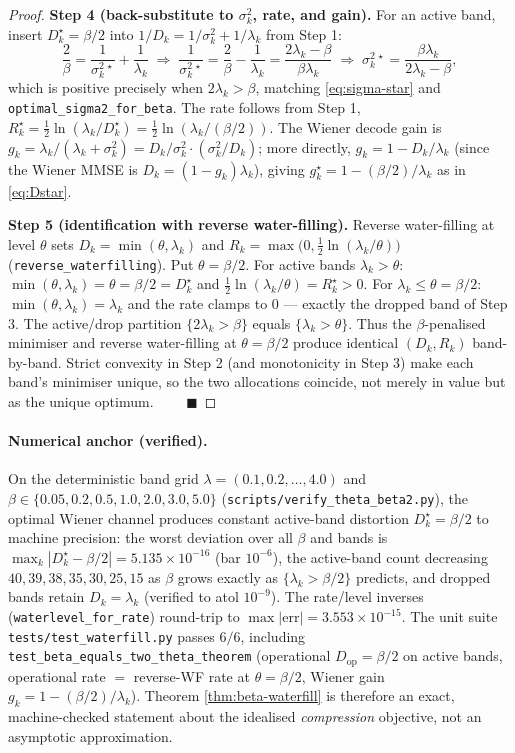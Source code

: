 \begin{proof}
\textbf{Step 4 (back-substitute to $\sigma_k^2$, rate, and gain).}
For an active band, insert $D_k^\star=\beta/2$ into
$1/D_k=1/\sigma_k^2+1/\lambda_k$ from Step 1:
\[
\frac{2}{\beta}=\frac{1}{\sigma_k^{2\,\star}}+\frac{1}{\lambda_k}
\;\Longrightarrow\;
\frac{1}{\sigma_k^{2\,\star}}=\frac{2}{\beta}-\frac{1}{\lambda_k}
=\frac{2\lambda_k-\beta}{\beta\lambda_k}
\;\Longrightarrow\;
\sigma_k^{2\,\star}=\frac{\beta\lambda_k}{2\lambda_k-\beta},
\]
which is positive precisely when $2\lambda_k>\beta$, matching
\eqref{eq:sigma-star} and \texttt{optimal\_sigma2\_for\_beta}. The rate follows
from Step 1, $R_k^\star=\tfrac12\ln(\lambda_k/D_k^\star)=\tfrac12\ln(\lambda_k/(\beta/2))$.
The Wiener decode gain is $g_k=\lambda_k/(\lambda_k+\sigma_k^2)=D_k/\sigma_k^2\cdot(\sigma_k^2/D_k)$; more directly, $g_k=1-D_k/\lambda_k$ (since the Wiener MMSE is $D_k=(1-g_k)\lambda_k$), giving $g_k^\star=1-(\beta/2)/\lambda_k$ as in \eqref{eq:Dstar}.

\textbf{Step 5 (identification with reverse water-filling).}
Reverse water-filling at level $\theta$ sets $D_k=\min(\theta,\lambda_k)$ and
$R_k=\max\!\bigl(0,\tfrac12\ln(\lambda_k/\theta)\bigr)$
(\texttt{reverse\_waterfilling}). Put $\theta=\beta/2$. For active bands
$\lambda_k>\theta$: $\min(\theta,\lambda_k)=\theta=\beta/2=D_k^\star$ and
$\tfrac12\ln(\lambda_k/\theta)=R_k^\star>0$. For $\lambda_k\le\theta=\beta/2$:
$\min(\theta,\lambda_k)=\lambda_k$ and the rate clamps to $0$ --- exactly the
dropped band of Step 3. The active/drop partition $\{2\lambda_k>\beta\}$ equals
$\{\lambda_k>\theta\}$. Thus the $\beta$-penalised minimiser and reverse
water-filling at $\theta=\beta/2$ produce identical $(D_k,R_k)$ band-by-band.
Strict convexity in Step 2 (and monotonicity in Step 3) make each band's
minimiser unique, so the two allocations coincide, not merely in value but as
the unique optimum. $\qquad\blacksquare$
\end{proof}

\paragraph{Numerical anchor (verified).}
On the deterministic band grid $\lambda=(0.1,0.2,\dots,4.0)$ and
$\beta\in\{0.05,0.2,0.5,1.0,2.0,3.0,5.0\}$
(\texttt{scripts/verify\_theta\_beta2.py}), the optimal Wiener channel produces
constant active-band distortion $D_k^\star=\beta/2$ to machine precision: the
worst deviation over all $\beta$ and bands is
$\max_k|D_k^\star-\beta/2|=5.135\times10^{-16}$ (bar $10^{-6}$), the active-band
count decreasing $40,39,38,35,30,25,15$ as $\beta$ grows exactly as
$\{\lambda_k>\beta/2\}$ predicts, and dropped bands retain $D_k=\lambda_k$
(verified to atol $10^{-9}$). The rate/level inverses
(\texttt{waterlevel\_for\_rate}) round-trip to $\max|\mathrm{err}|=3.553\times10^{-15}$.
The unit suite \texttt{tests/test\_waterfill.py} passes $6/6$, including
\texttt{test\_beta\_equals\_two\_theta\_theorem} (operational
$D_\mathrm{op}=\beta/2$ on active bands, operational rate $=$ reverse-WF rate at
$\theta=\beta/2$, Wiener gain $g_k=1-(\beta/2)/\lambda_k$). Theorem
\ref{thm:beta-waterfill} is therefore an exact, machine-checked statement about
the idealised \emph{compression} objective, not an asymptotic approximation.

